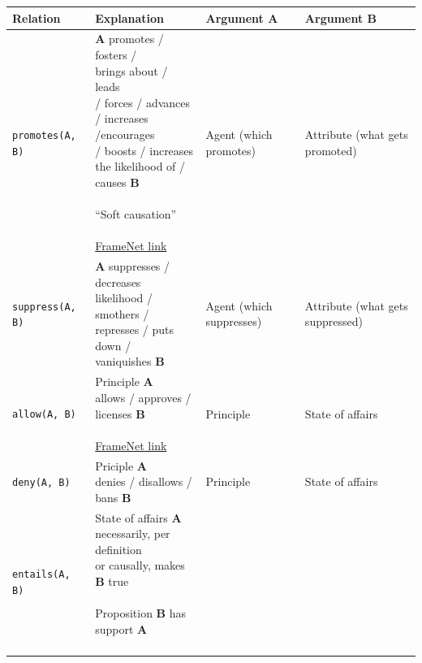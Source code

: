 \begin{footnotesize}
\begin{tabular}{lp{5cm}p{2.5cm}p{3cm}}
\toprule
Relation & Explanation & Argument A & Argument B \\
\midrule
\texttt{promotes(A, B)} & 
\makecell[cl]{
\textbf{A} promotes / fosters / \\
brings about / leads \\ 
/ forces / advances \\
/ increases /encourages \\
/ boosts / increases \\
the likelihood of / causes \textbf{B}  \\ \\
``Soft causation'' \\\\
\href{https://framenet2.icsi.berkeley.edu/fnReports/data/frameIndex.xml?frame=Cause_change_of_position_on_a_scale}{FrameNet link} 
}
& 
Agent (which promotes) & 
Attribute (what gets promoted) \\
\midrule
\texttt{suppress(A, B)} & 
\makecell[cl]{
\textbf{A} suppresses / decreases \\ 
likelihood / smothers / \\
represses / puts down / \\
vaniquishes \textbf{B} 
}
&
Agent (which suppresses) & 
Attribute (what gets suppressed)
\\
\midrule
\texttt{allow(A, B)} & 
\makecell[cl]{
Principle \textbf{A} \\ 
allows / approves / \\
licenses \textbf{B} \\\\
\href{https://framenet2.icsi.berkeley.edu/fnReports/data/frameIndex.xml?frame=Prohibiting_or_licensing}{FrameNet link}
} & 
Principle
& 
State of affairs \\
\midrule
\texttt{deny(A, B)} & 
\makecell[cl]{
Priciple \textbf{A} \\
denies / disallows /
bans \textbf{B} } & 
Principle & 
State of affairs\\
\midrule
\texttt{entails(A, B)} & 
\makecell[cl]{
State of affairs \textbf{A} \\
necessarily, per definition \\
or causally, makes \textbf{B} true \\\\
Proposition \textbf{B} has \\
support \textbf{A} \\\\
}
\end{tabular}
\end{footnotesize}
